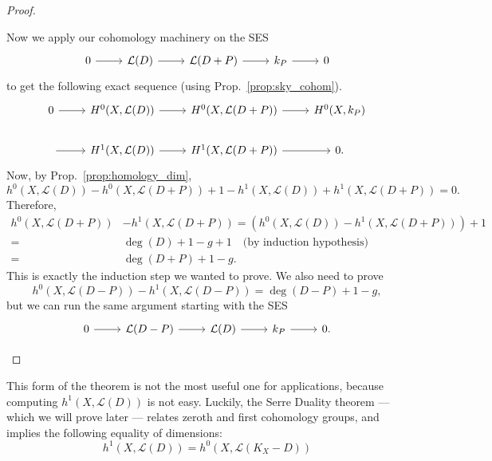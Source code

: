 \documentclass[12pt]{article}
\begin{document}
\begin{proof}
\begin{description}[style=nextline]
          Now we apply our cohomology machinery on the SES
          \[
          \begin{tikzcd}
            0\arrow{r} & \mathcal{L}(D)\arrow{r} & \mathcal{L}(D+P)\arrow{r}
            & k_{P}\arrow{r} & 0
          \end{tikzcd}
          \]
          to get the following exact sequence (using
          Prop.~\ref{prop:sky_cohom}).
          \[
          \begin{tikzcd}
            0\arrow{r} & H^{0}(X, \mathcal{L}(D))\arrow{r}
            & H^{0}(X, \mathcal{L}(D+P))\arrow{r}
            & H^{0}(X, k_{P}) \\
            \arrow{r} & H^{1}(X, \mathcal{L}(D))\arrow{r}
            & H^{1}(X, \mathcal{L}(D+P))\arrow{r} & 0.
          \end{tikzcd}
          \]
          Now, by Prop.~\ref{prop:homology_dim},
          \[
          h^{0}(X,\mathcal{L}(D))-h^{0}(X, \mathcal{L}(D+P))
          +1-h^{1}(X,\mathcal{L}(D))+h^{1}(X,\mathcal{L}(D+P)) = 0.
          \]
          Therefore,
          \begin{align*}
            h^{0}(X,\mathcal{L}(D+P))&-h^{1}(X,\mathcal{L}(D+P))
            =\left(h^{0}(X,\mathcal{L}(D))-h^{1}(X,\mathcal{L}(D+P))\right)
              +1 \\
            =&\deg(D)+1-g+1\quad\text{(by induction hypothesis)} \\
            =&\deg(D+P)+1-g.
          \end{align*}
          This is exactly the induction step we wanted to prove.
          We also need to prove
          \[
            h^{0}(X,\mathcal{L}(D-P))-h^{1}(X,\mathcal{L}(D-P))
            =\deg(D-P)+1-g,
          \]
          but we can run the same argument starting with the SES
          \[
          \begin{tikzcd}
            0\arrow{r} & \mathcal{L}(D-P)\arrow{r} & \mathcal{L}(D)\arrow{r}
            & k_{P}\arrow{r} & 0.
          \end{tikzcd}
          \]
  \end{description}
\end{proof}

This form of the theorem is not the most useful one for applications,
because computing $h^{1}(X,\mathcal{L}(D))$ is not easy. Luckily, the Serre
Duality theorem --- which we will prove later --- relates zeroth and first
cohomology groups, and implies the following equality of dimensions:
\[h^{1}(X,\mathcal{L}(D))=h^{0}(X,\mathcal{L}(K_{X}-D))\]
\end{document}
